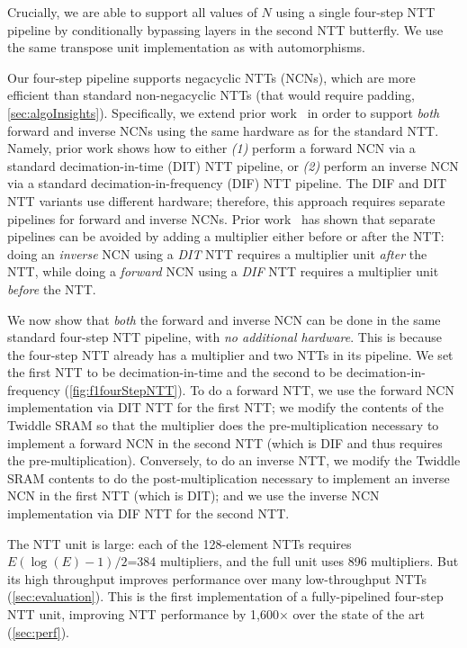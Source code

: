 Crucially, we are able to support all values of $N$ using a single four-step NTT pipeline by conditionally bypassing layers in the second NTT butterfly.
We use the same transpose unit implementation as with automorphisms.

Our four-step pipeline supports negacyclic NTTs (NCNs), which are more efficient than standard non-negacyclic NTTs (that would require padding, \autoref{sec:algoInsights}). Specifically, we extend prior work~\cite{poppelmann2015high,roy2014compact,lyubashevsky:tact10:ideal} in order to support \emph{both} forward and inverse NCNs using the same hardware as for the standard NTT. Namely, prior work shows how to either \emph{(1)} perform a forward NCN via a standard decimation-in-time (DIT) NTT pipeline, or \emph{(2)} perform an inverse NCN via a standard decimation-in-frequency (DIF) NTT pipeline. The DIF and DIT NTT variants use different hardware; therefore, this approach requires separate pipelines for forward and inverse NCNs. Prior work~\cite{lyubashevsky:tact10:ideal} has shown that separate pipelines can be avoided by adding a multiplier either before or after the NTT: doing an \emph{inverse} NCN using a \emph{DIT} NTT requires a multiplier unit \emph{after} the NTT, while doing a \emph{forward} NCN using a \emph{DIF} NTT requires a multiplier unit \emph{before} the NTT.

We now show that \emph{both} the forward and inverse NCN can be done in the same standard four-step NTT pipeline, with \emph{no additional hardware}. This is because the four-step NTT already has a multiplier and two NTTs in its pipeline. We set the first NTT to be decimation-in-time and the second to be decimation-in-frequency (\autoref{fig:f1fourStepNTT}). To do a forward NTT, we use the forward NCN implementation via DIT NTT for the first NTT; we modify the contents of the Twiddle SRAM so that the multiplier does the pre-multiplication necessary to implement a forward NCN in the second NTT (which is DIF and thus requires the pre-multiplication). Conversely, to do an inverse NTT, we modify the Twiddle SRAM contents to do the post\hyp{}mul\-ti\-pli\-ca\-tion necessary to implement an inverse NCN in the first NTT (which is DIT); and we use the inverse NCN imple\-men\-ta\-tion via DIF NTT for the second NTT.

The NTT unit is large: each of the 128-element NTTs requires $E(\log (E)-1)/2$=384 multipliers,
and the full unit uses 896 multipliers.
But its high throughput improves performance over many low-throughput NTTs (\autoref{sec:evaluation}). %
This is the first implementation of a fully-pipelined four-step NTT unit, 
improving NTT performance by 1,600$\times$ over the state of the art (\autoref{sec:perf}).


